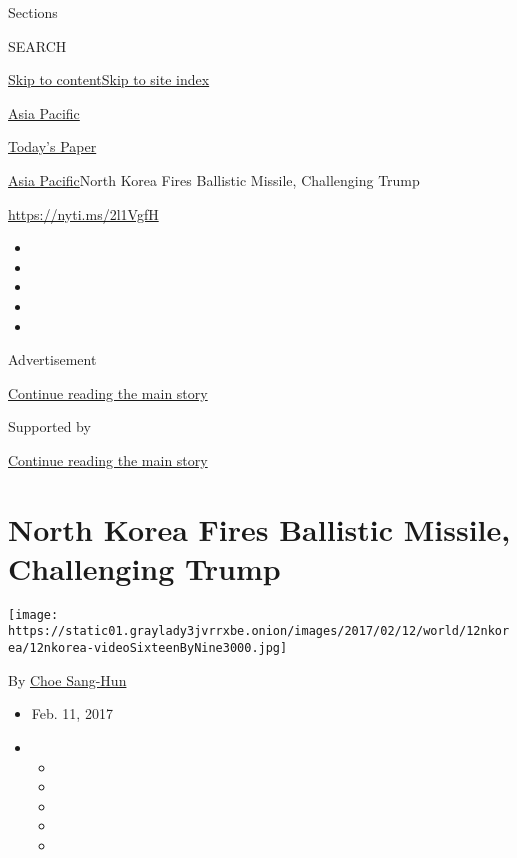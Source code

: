 Sections

SEARCH

\protect\hyperlink{site-content}{Skip to
content}\protect\hyperlink{site-index}{Skip to site index}

\href{https://www.nytimes3xbfgragh.onion/section/world/asia}{Asia
Pacific}

\href{https://myaccount.nytimes3xbfgragh.onion/auth/login?response_type=cookie\&client_id=vi}{}

\href{https://www.nytimes3xbfgragh.onion/section/todayspaper}{Today's
Paper}

\href{/section/world/asia}{Asia Pacific}\textbar{}North Korea Fires
Ballistic Missile, Challenging Trump

\url{https://nyti.ms/2l1VgfH}

\begin{itemize}
\item
\item
\item
\item
\item
\end{itemize}

Advertisement

\protect\hyperlink{after-top}{Continue reading the main story}

Supported by

\protect\hyperlink{after-sponsor}{Continue reading the main story}

\hypertarget{north-korea-fires-ballistic-missile-challenging-trump}{%
\section{North Korea Fires Ballistic Missile, Challenging
Trump}\label{north-korea-fires-ballistic-missile-challenging-trump}}

\texttt{[image: https://static01.graylady3jvrrxbe.onion/images/2017/02/12/world/12nkorea/12nkorea-videoSixteenByNine3000.jpg]}

By \href{http://www.nytimes3xbfgragh.onion/by/choe-sang-hun}{Choe
Sang-Hun}

\begin{itemize}
\item
  Feb. 11, 2017
\item
  \begin{itemize}
  \item
  \item
  \item
  \item
  \item
  \end{itemize}
\end{itemize}

